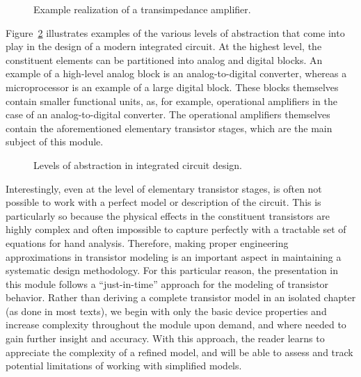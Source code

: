 \documentclass[
  11pt,
  letterpaper,
  abstract]{scrbook}
\begin{document}
\begin{figure}


\caption{\label{fig-1.5}Example realization of a transimpedance
amplifier.}

\end{figure}%

Figure~\ref{fig-1.6} illustrates examples of the various levels of
abstraction that come into play in the design of a modern integrated
circuit. At the highest level, the constituent elements can be
partitioned into analog and digital blocks. An example of a high-level
analog block is an analog-to-digital converter, whereas a microprocessor
is an example of a large digital block. These blocks themselves contain
smaller functional units, as, for example, operational amplifiers in the
case of an analog-to-digital converter. The operational amplifiers
themselves contain the aforementioned elementary transistor stages,
which are the main subject of this module.

\begin{figure}


\caption{\label{fig-1.6}Levels of abstraction in integrated circuit
design.}

\end{figure}%

Interestingly, even at the level of elementary transistor stages, is
often not possible to work with a perfect model or description of the
circuit. This is particularly so because the physical effects in the
constituent transistors are highly complex and often impossible to
capture perfectly with a tractable set of equations for hand analysis.
Therefore, making proper engineering approximations in transistor
modeling is an important aspect in maintaining a systematic design
methodology. For this particular reason, the presentation in this module
follows a ``just-in-time'' approach for the modeling of transistor
behavior. Rather than deriving a complete transistor model in an
isolated chapter (as done in most texts), we begin with only the basic
device properties and increase complexity throughout the module upon
demand, and where needed to gain further insight and accuracy. With this
approach, the reader learns to appreciate the complexity of a refined
model, and will be able to assess and track potential limitations of
working with simplified models.
\end{document}
